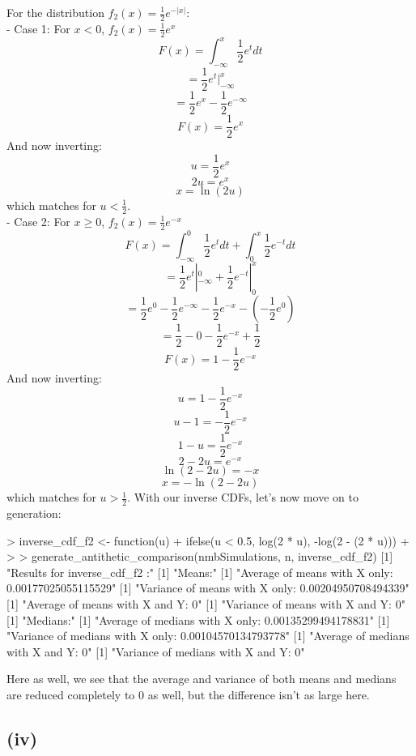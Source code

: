 \documentclass{article}
\begin{document}
{For the distribution \(f_2(x) = \frac{1}{2}e^{-|x|}\): \\
- Case 1: For \(x < 0\), \(f_2(x) = \frac{1}{2}e^{x}\) 
\[
  F(x) = \int_{-\infty}^{x} \frac{1}{2}e^{t} dt
\]
\[
  = \frac{1}{2}e^{t} |_{-\infty}^{x}
\]
\[
  = \frac{1}{2}e^{x} - \frac{1}{2}e^{-\infty}
\]
\[
  F(x) = \frac{1}{2}e^{x}
\]
And now inverting:
\[
  u = \frac{1}{2}e^{x}
\]
\[
  2u = e^{x}
\]
\[
  x = \ln(2u)
\]
which matches for \(u < \frac{1}{2}\). \\
- Case 2: For \(x \geq 0\), \(f_2(x) = \frac{1}{2}e^{-x}\)
\[
  F(x) = \int_{-\infty}^{0} \frac{1}{2}e^{t} dt + \int_{0}^{x} \frac{1}{2}e^{-t} dt
\]
\[
  = \frac{1}{2}e^{t} |_{-\infty}^{0} + \frac{1}{2}e^{-t} |_{0}^{x}
\]
\[
  = \frac{1}{2}e^{0} - \frac{1}{2}e^{-\infty} - \frac{1}{2}e^{-x} - (-\frac{1}{2}e^{0}) 
\]
\[
  = \frac{1}{2} - 0 - \frac{1}{2}e^{-x} + \frac{1}{2}
\]
\[
  F(x) = 1 - \frac{1}{2}e^{-x}
\]
And now inverting:
\[
  u = 1 - \frac{1}{2}e^{-x}
\]
\[
  u - 1 = - \frac{1}{2}e^{-x}
\]
\[
  1 - u = \frac{1}{2}e^{-x}
\]
\[
  2 - 2u = e^{-x}
\]
\[
  \ln(2 - 2u) = -x
\]
\[
  x = -\ln(2 - 2u)
\]
which matches for \(u > \frac{1}{2}\).
With our inverse CDFs, let's now move on to generation:
\begin{spverbatim}
> inverse_cdf_f2 <- function(u) {
+   ifelse(u < 0.5, log(2 * u), -log(2 - (2 * u)))
+ }
> 
> generate_antithetic_comparison(nmbSimulations, n, inverse_cdf_f2)
[1] "Results for inverse_cdf_f2 :"
[1] "Means:"
[1] "Average of means with X only: 0.00177025055115529"
[1] "Variance of means with X only: 0.00204950708494339"
[1] "Average of means with X and Y: 0"
[1] "Variance of means with X and Y: 0"
[1] "Medians:"
[1] "Average of medians with X only: 0.00135299494178831"
[1] "Variance of medians with X only: 0.00104570134793778"
[1] "Average of medians with X and Y: 0"
[1] "Variance of medians with X and Y: 0"
\end{spverbatim}
Here as well, we see that the average and variance of both means and medians are reduced completely to 0 as well, but the difference isn't as large here.

\subsection*{(iv)}

}
\end{document}
